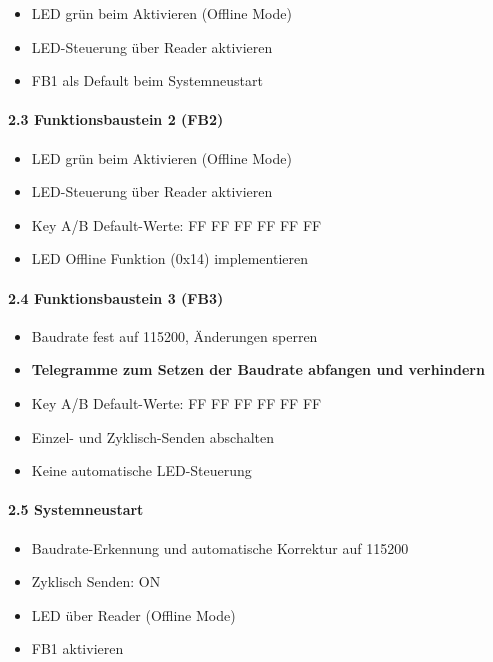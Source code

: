 \documentclass[a4paper,11pt]{article}
\providecommand{\tightlist}{\setlength{\itemsep}{0pt}\setlength{\parskip}{0pt}}
\begin{document}
\begin{itemize}
\tightlist
\item
  LED grün beim Aktivieren (Offline Mode)
\item
  LED-Steuerung über Reader aktivieren
\item
  FB1 als Default beim Systemneustart
\end{itemize}

\hypertarget{funktionsbaustein-2-fb2}{%
\paragraph{2.3 Funktionsbaustein 2
(FB2)}\label{funktionsbaustein-2-fb2}}

\begin{itemize}
\tightlist
\item
  LED grün beim Aktivieren (Offline Mode)
\item
  LED-Steuerung über Reader aktivieren
\item
  Key A/B Default-Werte: FF FF FF FF FF FF
\item
  LED Offline Funktion (0x14) implementieren
\end{itemize}

\hypertarget{funktionsbaustein-3-fb3}{%
\paragraph{2.4 Funktionsbaustein 3
(FB3)}\label{funktionsbaustein-3-fb3}}

\begin{itemize}
\tightlist
\item
  Baudrate fest auf 115200, Änderungen sperren
\item
  \textbf{Telegramme zum Setzen der Baudrate abfangen und verhindern}
\item
  Key A/B Default-Werte: FF FF FF FF FF FF
\item
  Einzel- und Zyklisch-Senden abschalten
\item
  Keine automatische LED-Steuerung
\end{itemize}

\hypertarget{systemneustart}{%
\paragraph{2.5 Systemneustart}\label{systemneustart}}

\begin{itemize}
\tightlist
\item
  Baudrate-Erkennung und automatische Korrektur auf 115200
\item
  Zyklisch Senden: ON
\item
  LED über Reader (Offline Mode)
\item
  FB1 aktivieren
\end{itemize}
\end{document}
